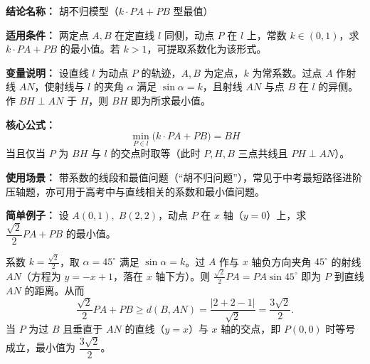 \textbf{结论名称：} 胡不归模型（\(k\cdot PA + PB\) 型最值）

\textbf{适用条件：} 两定点 \(A,B\) 在定直线 \(l\) 同侧，动点 \(P\) 在 \(l\) 上，常数 \(k\in(0,1)\)，求 \(k\cdot PA+PB\) 的最小值。若 \(k>1\)，可提取系数化为该形式。

\textbf{变量说明：} 设直线 \(l\) 为动点 \(P\) 的轨迹，\(A,B\) 为定点，\(k\) 为常系数。过点 \(A\) 作射线 \(AN\)，使射线与 \(l\) 的夹角 \(\alpha\) 满足 \(\sin\alpha=k\)，且射线 \(AN\) 与点 \(B\) 在 \(l\) 的异侧。作 \(BH\perp AN\) 于 \(H\)，则 \(BH\) 即为所求最小值。

\textbf{核心公式：}
\[
\boxed{\min_{P\in l}\bigl(k\cdot PA+PB\bigr)=BH}
\]
当且仅当 \(P\) 为 \(BH\) 与 \(l\) 的交点时取等（此时 \(P,H,B\) 三点共线且 \(PH\perp AN\)）。

\textbf{使用场景：} 带系数的线段和最值问题（“胡不归问题”），常见于中考最短路径进阶压轴题，亦可用于高考中与直线相关的系数和最小值问题。

\textbf{简单例子：} 设 \(A(0,1),\;B(2,2)\)，动点 \(P\) 在 \(x\) 轴（\(y=0\)）上，求 \(\dfrac{\sqrt{2}}{2}PA+PB\) 的最小值。

系数 \(k=\frac{\sqrt{2}}{2}\)，取 \(\alpha=45^\circ\) 满足 \(\sin\alpha=k\)。过 \(A\) 作与 \(x\) 轴负方向夹角 \(45^\circ\) 的射线 \(AN\)（方程为 \(y=-x+1\)，落在 \(x\) 轴下方）。则 \(\frac{\sqrt{2}}{2}PA = PA\sin 45^\circ\) 即为 \(P\) 到直线 \(AN\) 的距离。从而
\[
\frac{\sqrt{2}}{2}PA+PB \geqslant d(B,AN)=\frac{|2+2-1|}{\sqrt{2}}=\frac{3\sqrt{2}}{2}.
\]
当 \(P\) 为过 \(B\) 且垂直于 \(AN\) 的直线（\(y=x\)）与 \(x\) 轴的交点，即 \(P(0,0)\) 时等号成立，最小值为 \(\dfrac{3\sqrt{2}}{2}\)。